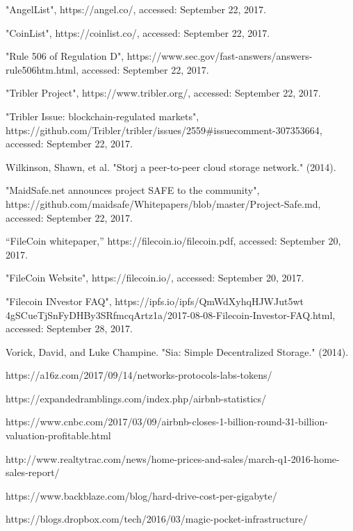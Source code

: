 \documentclass[conference]{IEEEtran}
\begin{document}
\begin{thebibliography}{1}
 "AngelList", https://angel.co/, accessed: September 22, 2017.

 "CoinList", https://coinlist.co/, accessed: September 22, 2017.

 "Rule 506 of Regulation D", https://www.sec.gov/fast-answers/answers-rule506htm.html, accessed: September 22, 2017.

 "Tribler Project", https://www.tribler.org/, accessed: September 22, 2017.

"Tribler Issue: blockchain-regulated markets", https://github.com/Tribler/tribler/issues/2559\#issuecomment-307353664, accessed: September 22, 2017.

 Wilkinson, Shawn, et al. "Storj a peer-to-peer cloud storage network." (2014).

 "MaidSafe.net announces project SAFE to the community", https://github.com/maidsafe/Whitepapers/blob/master/Project-Safe.md, accessed: September 22, 2017.

 “FileCoin
whitepaper,” https://filecoin.io/filecoin.pdf, accessed: September 20, 2017.

 "FileCoin Website", https://filecoin.io/, accessed: September 20, 2017.

 "Filecoin INvestor FAQ", https://ipfs.io/ipfs/QmWdXyhqHJWJut5wt\\4gSCueTjSnFyDHBy3SRfmcqArtz1a/2017-08-08-Filecoin-Investor-FAQ.html, accessed: September 28, 2017.

 Vorick, David, and Luke Champine. "Sia: Simple Decentralized Storage." (2014).

 https://a16z.com/2017/09/14/networks-protocols-labs-tokens/

 https://expandedramblings.com/index.php/airbnb-statistics/

 https://www.cnbc.com/2017/03/09/airbnb-closes-1-billion-round-31-billion-valuation-profitable.html

 http://www.realtytrac.com/news/home-prices-and-sales/march-q1-2016-home-sales-report/

 https://www.backblaze.com/blog/hard-drive-cost-per-gigabyte/

 https://blogs.dropbox.com/tech/2016/03/magic-pocket-infrastructure/


\end{thebibliography}
\end{document}
